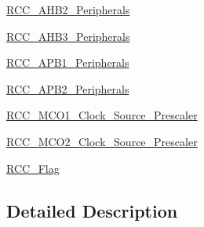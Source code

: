 \begin{DoxyCompactItemize}
\mbox{\hyperlink{group___r_c_c___a_h_b2___peripherals}{R\+C\+C\+\_\+\+A\+H\+B2\+\_\+\+Peripherals}}
\item 
\mbox{\hyperlink{group___r_c_c___a_h_b3___peripherals}{R\+C\+C\+\_\+\+A\+H\+B3\+\_\+\+Peripherals}}
\item 
\mbox{\hyperlink{group___r_c_c___a_p_b1___peripherals}{R\+C\+C\+\_\+\+A\+P\+B1\+\_\+\+Peripherals}}
\item 
\mbox{\hyperlink{group___r_c_c___a_p_b2___peripherals}{R\+C\+C\+\_\+\+A\+P\+B2\+\_\+\+Peripherals}}
\item 
\mbox{\hyperlink{group___r_c_c___m_c_o1___clock___source___prescaler}{R\+C\+C\+\_\+\+M\+C\+O1\+\_\+\+Clock\+\_\+\+Source\+\_\+\+Prescaler}}
\item 
\mbox{\hyperlink{group___r_c_c___m_c_o2___clock___source___prescaler}{R\+C\+C\+\_\+\+M\+C\+O2\+\_\+\+Clock\+\_\+\+Source\+\_\+\+Prescaler}}
\item 
\mbox{\hyperlink{group___r_c_c___flag}{R\+C\+C\+\_\+\+Flag}}
\end{DoxyCompactItemize}


\subsection{Detailed Description}
